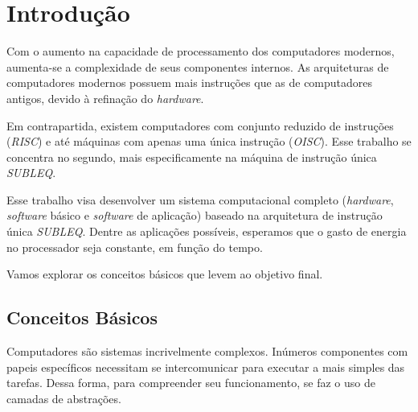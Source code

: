 \chapter{Introdução}


Com o aumento na capacidade de processamento dos computadores modernos,
aumenta-se a complexidade de seus componentes internos. As arquiteturas de
computadores modernos possuem mais instruções que as de computadores antigos,
devido à refinação do \textit{hardware}.

Em contrapartida, existem computadores com conjunto reduzido de instruções
(\textit{RISC}) e até máquinas com apenas uma única instrução
(\textit{OISC}). Esse trabalho se concentra no segundo, mais especificamente na
máquina de instrução única \textit{SUBLEQ}.

Esse trabalho visa desenvolver um sistema computacional completo
(\textit{hardware}, \textit{software} básico e \textit{software} de aplicação)
baseado na arquitetura de instrução única \textit{SUBLEQ}. Dentre as aplicações
possíveis, esperamos que o gasto de energia no processador seja constante, em
função do tempo.


Vamos explorar os conceitos básicos que levem ao objetivo final.

\section{Conceitos Básicos}


Computadores são sistemas incrivelmente complexos. Inúmeros componentes com
papeis específicos necessitam se intercomunicar para executar a mais simples das
tarefas. Dessa forma, para compreender seu funcionamento, se faz o uso de
camadas de abstrações.

